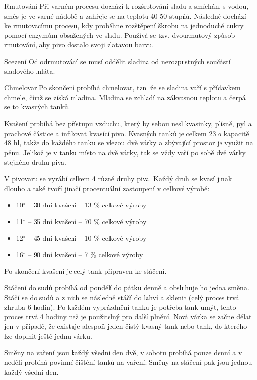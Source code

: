 \documentclass[11pt,a4paper]{article}
\begin{document}
Rmutování
Při varném procesu dochází k rozšrotování sladu a smíchání s vodou, směs je ve varné nádobě a zahřeje se na teplotu 40-50 stupňů. Následně dochází ke rmutovacímu procesu, kdy proběhne rozštěpení škrobu na jednoduché cukry pomocí enzymům obsažených ve sladu. Používá se tzv. dvourmutový způsob rmutování, aby pivo dostalo svoji zlatavou barvu.

Scezení
Od odrmutování se musí oddělit sladina od nerozpustných součástí sladového mláta.

Chmelovar
Po skončení probíhá chmelovar, tzn. že se sladina vaří s přídavkem chmele, čímž se získá mladina. Mladina se zchladí na zákvasnou teplotu a čerpá se to kvasných tanků. 

Kvašení probíhá bez přístupu vzduchu, který by sebou nesl kvasinky, plísně, pyl a prachové částice a infikovat kvasící pivo. Kvasných tanků je celkem 23 o kapacitě 48 hl, takže do každého tanku se vlezou dvě várky a zbývající prostor je využit na pěnu. Jelikož je v tanku místo na dvě várky, tak se vždy vaří po sobě dvě várky stejného druhu piva. 

V pivovaru se vyrábí celkem 4 různé druhy piva. Každý druh se kvasí jinak dlouho a také tvoří jinačí procentuální zastoupení v celkové výrobě:
\begin{itemize}
  \item 10$^\circ$ -- 30 dní kvašení -- 13 \% celkové výroby
  \item 11$^\circ$ -- 35 dní kvašení -- 70 \% celkové výroby
  \item 12$^\circ$ -- 45 dní kvašení -- 10 \% celkové výroby
  \item 16$^\circ$ -- 90 dní kvašení -- 7 \% celkové výroby
\end{itemize}

Po skončení kvašení je celý tank připraven ke stáčení. 

Stáčení do sudů probíhá od pondělí do pátku denně a obsluhuje ho jedna směna. Stáčí se do sudů a z nich se následně stáčí do lahví a sklenic (celý proces trvá zhruba 6 hodin). Po každém vyprázdnění tanku je potřeba tank umýt, tento proces trvá 4 hodiny než je použitelný pro další plnění. Nová várka se začne dělat jen v případě, že existuje alespoň jeden čistý kvasný tank nebo tank, do kterého lze doplnit ještě jednu várku.

Směny na vaření jsou každý všední den dvě, v sobotu probíhá pouze denní a v neděli probíhá povinné čištění tanků na vaření. Směny na stáčení pak jsou jednou každý všední den.
\end{document}
